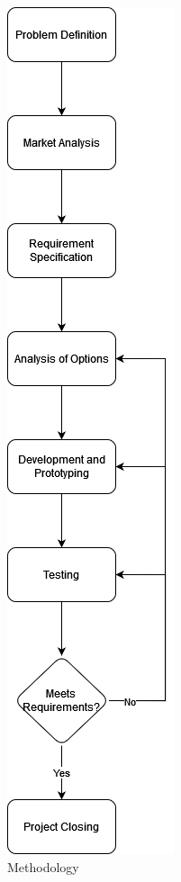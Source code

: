 \begin{figure}[!ht]
    \caption{Methodology}\label{fig:methodology}
    \centering
    \includegraphics[scale=0.40]{chapters/project_plan/figures/Methodology}
\end{figure}

